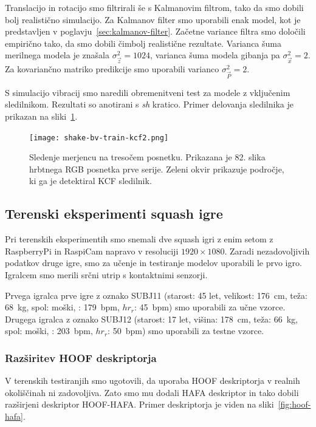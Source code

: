 Translacijo in rotacijo smo filtrirali še s Kalmanovim filtrom, tako da smo dobili bolj realistično simulacijo. Za Kalmanov filter smo uporabili enak model, kot je predstavljen v poglavju~\ref{sec:kalmanov-filter}. Začetne variance filtra smo določili empirično tako, da smo dobili čimbolj realistične rezultate. Varianca šuma merilnega modela je znašala $\sigma_\vec{z}^2=1024$, varianca šuma modela gibanja pa $\sigma_\vec{x}^2=2$. Za kovariančno matriko predikcije smo uporabili varianco $\sigma_\vec{P}^2=2$.

S simulacijo vibracij smo naredili obremenitveni test za modele z vključenim sledilnikom. Rezultati so anotirani s \textit{sh} kratico. Primer delovanja sledilnika je prikazan na sliki~\ref{fig:vibracije}.

\begin{figure}[!htb]
	\centering
	\texttt{[image: shake-bv-train-kcf2.png]}
	\caption[Sledenje merjencu na tresočem posnetku]{Sledenje merjencu na tresočem posnetku. Prikazana je 82. slika hrbtnega RGB posnetka prve serije. Zeleni okvir prikazuje področje, ki ga je detektiral KCF sledilnik.}
	\label{fig:vibracije}
\end{figure} 








\subsection{Terenski eksperimenti squash igre}
Pri terenskih eksperimentih smo snemali dve squash igri z enim setom z RaspberryPi in RaspiCam napravo v resoluciji  $1920 \times 1080$. Zaradi nezadovoljivih podatkov druge igre, smo za učenje in testiranje modelov uporabili le prvo igro. Igralcem smo merili srčni utrip s kontaktnimi senzorji. 

Prvega igralca prve igre z oznako SUBJ11  (starost: 45 let, velikost: \SI{176}{\cm}, teža: \SI{68}{\kg}, spol: moški, \hrtmax: \SI{179}{bpm}, $hr_{r}$: \SI{45}{bpm}) smo uporabili za učne vzorce. Drugega igralca z oznako SUBJ12 (starost: 17 let, višina: \SI{178}{\cm}, teža: \SI{66}{\kg}, spol: moški, \hrtmax: \SI{203}{bpm}, $hr_{r}$: \SI{50}{bpm}) smo uporabili za testne vzorce. 

\subsubsection{Razširitev HOOF deskriptorja}
V terenskih testiranjih smo ugotovili, da uporaba HOOF deskriptorja v realnih okoliščinah ni zadovoljiva. Zato smo mu dodali HAFA deskriptor in tako dobili razširjeni deskriptor HOOF-HAFA. Primer deskriptorja je viden na sliki~\ref{fig:hoof-hafa}.

